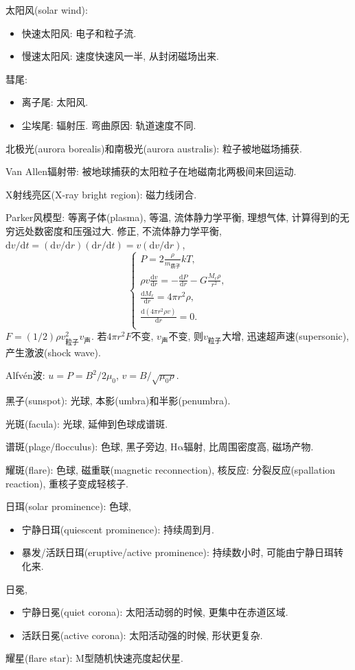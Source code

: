 太阳风(solar wind):
\begin{itemize}
    \item 快速太阳风: 电子和粒子流.
    \item 慢速太阳风: 速度快速风一半, 从封闭磁场出来.
\end{itemize}

彗尾:
\begin{itemize}
    \item 离子尾: 太阳风.
    \item 尘埃尾: 辐射压. 弯曲原因: 轨道速度不同.
\end{itemize}

北极光(aurora borealis)和南极光(aurora australis): 粒子被地磁场捕获.

Van Allen辐射带: 被地球捕获的太阳粒子在地磁南北两极间来回运动.

X射线亮区(X-ray bright region): 磁力线闭合.

Parker风模型: 等离子体(plasma), 等温, 流体静力学平衡, 理想气体, 计算得到的无穷远处数密度和压强过大. 修正, 不流体静力学平衡, $\mathrm{d}v/\mathrm{d}t=(\mathrm{d}v/\mathrm{d}r)(\mathrm{d}r/\mathrm{d}t)=v(\mathrm{d}v/\mathrm{d}r)$,
\begin{equation*}
    \begin{cases}
        P = 2\frac{\rho}{m_\text{质子}}kT, \\
        \rho v \frac{\mathrm{d}v}{\mathrm{d}r}=-\frac{\mathrm{d}P}{\mathrm{d}r}-G\frac{M_r\rho}{r^2}, \\
        \frac{\mathrm{d}M_r}{\mathrm{d}r}=4\pi r^2\rho, \\
        \frac{\mathrm{d}(4\pi r^2\rho v)}{\mathrm{d}r}=0. \\
    \end{cases}
\end{equation*}
$F=(1/2)\rho v_\text{粒子}^2v_\text{声}$. 若$4\pi r^2F$不变, $v_\text{声}$不变, 则$v_\text{粒子}$大增, 迅速超声速(supersonic), 产生激波(shock wave).

Alfv\'en波: $u=P=B^2/2\mu_0$, $v=B/\sqrt{\mu_0\rho}$.

黑子(sunspot): 光球, 本影(umbra)和半影(penumbra).

光斑(facula): 光球, 延伸到色球成谱斑.

谱斑(plage/flocculus): 色球, 黑子旁边, H$\mathrm{\alpha}$辐射, 比周围密度高, 磁场产物.

耀斑(flare): 色球, 磁重联(magnetic reconnection), 核反应: 分裂反应(spallation reaction), 重核子变成轻核子.

日珥(solar prominence): 色球,
\begin{itemize}
    \item 宁静日珥(quiescent prominence): 持续周到月.
    \item 暴发/活跃日珥(eruptive/active prominence): 持续数小时, 可能由宁静日珥转化来.
\end{itemize}

日冕,
\begin{itemize}
    \item 宁静日冕(quiet corona): 太阳活动弱的时候, 更集中在赤道区域.
    \item 活跃日冕(active corona): 太阳活动强的时候, 形状更复杂.
\end{itemize}

耀星(flare star): M型随机快速亮度起伏星.
